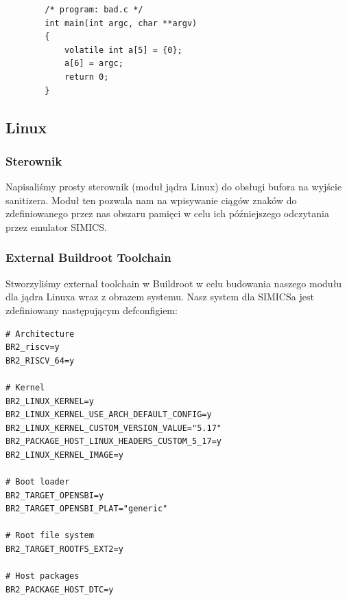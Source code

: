 \documentclass[../main.tex]{subfiles}
\begin{document}
\begin{listing}[H]
	\begin{verbatim}
		/* program: bad.c */
		int main(int argc, char **argv)
		{
			volatile int a[5] = {0};
			a[6] = argc;
			return 0;
		}
	\end{verbatim}
\end{listing}

\subsection{Linux}

\subsubsection{Sterownik}
Napisaliśmy prosty sterownik (moduł jądra Linux) do obsługi bufora na wyjście sanitizera. Moduł ten pozwala nam na wpisywanie ciągów znaków do zdefiniowanego przez nas obszaru pamięci w celu ich późniejszego odczytania przez emulator SIMICS.


\subsubsection{External Buildroot Toolchain}
Stworzyliśmy external toolchain w Buildroot w celu budowania naszego modułu dla jądra Linuxa wraz z obrazem systemu. Nasz system dla SIMICSa jest zdefiniowany następującym defconfigiem:

\begin{listing}[H]
	\begin{verbatim}
# Architecture
BR2_riscv=y
BR2_RISCV_64=y

# Kernel
BR2_LINUX_KERNEL=y
BR2_LINUX_KERNEL_USE_ARCH_DEFAULT_CONFIG=y
BR2_LINUX_KERNEL_CUSTOM_VERSION_VALUE="5.17"
BR2_PACKAGE_HOST_LINUX_HEADERS_CUSTOM_5_17=y
BR2_LINUX_KERNEL_IMAGE=y

# Boot loader
BR2_TARGET_OPENSBI=y
BR2_TARGET_OPENSBI_PLAT="generic"

# Root file system
BR2_TARGET_ROOTFS_EXT2=y

# Host packages
BR2_PACKAGE_HOST_DTC=y
		\end{verbatim}
	\end{listing}
\end{document}
